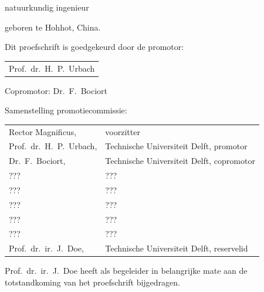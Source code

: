 \begin{titlepage}
\begin{center}
\bigskip
\bigskip

natuurkundig ingenieur

geboren te Hohhot, China.

\vspace*{2\bigskipamount}

\end{center}

\clearpage
\thispagestyle{empty}

\noindent Dit proefschrift is goedgekeurd door de promotor:

\medskip\noindent
\begin{tabular}{l}
    Prof.\ dr.\ H.\ P.\ Urbach
\end{tabular}

\medskip
\noindent Copromotor: Dr.\ F.\ Bociort

\medskip
\noindent Samenstelling promotiecommissie:

\medskip\noindent
\begin{tabular}{ll}
    Rector Magnificus, & voorzitter \\
    Prof.\ dr.\ H.\ P.\ Urbach, & Technische Universiteit Delft, promotor \\
    Dr.\ F.\ Bociort, & Technische Universiteit Delft, copromotor \\
    ??? & ??? \\
    ??? & ??? \\
    ??? & ??? \\
    ??? & ??? \\
    ??? & ??? \\
    Prof.\ dr.\ ir.\ J.\ Doe, & Technische Universiteit Delft, reservelid
\end{tabular}

\medskip
\noindent Prof.\ dr.\ ir.\ J.\ Doe heeft als begeleider in belangrijke mate aan de totstandkoming van het proefschrift bijgedragen.


\end{titlepage}
